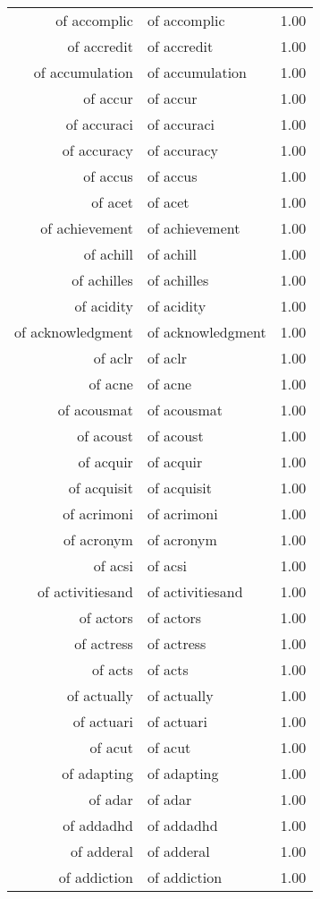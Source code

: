 \begin{table}[ht]
\begin{tabular}{rlr}
  of accomplic & of accomplic & 1.00 \\ 
  of accredit & of accredit & 1.00 \\ 
  of accumulation & of accumulation & 1.00 \\ 
  of accur & of accur & 1.00 \\ 
  of accuraci & of accuraci & 1.00 \\ 
  of accuracy & of accuracy & 1.00 \\ 
  of accus & of accus & 1.00 \\ 
  of acet & of acet & 1.00 \\ 
  of achievement & of achievement & 1.00 \\ 
  of achill & of achill & 1.00 \\ 
  of achilles & of achilles & 1.00 \\ 
  of acidity & of acidity & 1.00 \\ 
  of acknowledgment & of acknowledgment & 1.00 \\ 
  of aclr & of aclr & 1.00 \\ 
  of acne & of acne & 1.00 \\ 
  of acousmat & of acousmat & 1.00 \\ 
  of acoust & of acoust & 1.00 \\ 
  of acquir & of acquir & 1.00 \\ 
  of acquisit & of acquisit & 1.00 \\ 
  of acrimoni & of acrimoni & 1.00 \\ 
  of acronym & of acronym & 1.00 \\ 
  of acsi & of acsi & 1.00 \\ 
  of activitiesand & of activitiesand & 1.00 \\ 
  of actors & of actors & 1.00 \\ 
  of actress & of actress & 1.00 \\ 
  of acts & of acts & 1.00 \\ 
  of actually & of actually & 1.00 \\ 
  of actuari & of actuari & 1.00 \\ 
  of acut & of acut & 1.00 \\ 
  of adapting & of adapting & 1.00 \\ 
  of adar & of adar & 1.00 \\ 
  of addadhd & of addadhd & 1.00 \\ 
  of adderal & of adderal & 1.00 \\ 
  of addiction & of addiction & 1.00 \\ 

\end{tabular}
\end{table}
